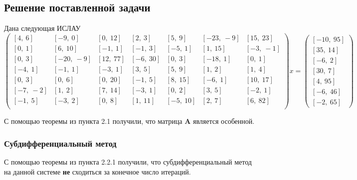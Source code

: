 \documentclass{article}
\begin{document}
    
    \subsection{Решение поставленной задачи}
    Дана следующая ИСЛАУ 
    \begin{equation*}
        \begin{pmatrix}
             [4, \ 6] & [-9, \ 0] & [0, \ 12] & [2, \ 3] & [5, \ 9] & [-23, \ -9] & [15, \ 23]\\
             [0, \ 1] & [6, \ 10] & [-1, \ 1] & [-1, \ 3] & [-5, \ 1] & [1, \ 15] & [-3, \ -1]\\
             [0, \ 3] & [-20, \ -9] & [12, \ 77] & [-6, \ 30] & [0, \ 3] & [-18, \ 1] & [0, \ 1]\\
             [-4, \ 1] & [-1, \ 1] & [-3, \ 1] & [3, \ 5] & [5, \ 9] & [1, \ 2] & [1, \ 4]\\
             [0, \ 3] & [0, \ 6] & [0, \ 20] & [-1, \ 5] & [8, \ 15] & [-6, \ 1] & [10, \ 17]\\
             [-7, \ -2] & [1, \ 2] & [7, \ 14] & [-3, \ 1] & [0, \ 2] & [3, \ 5] & [-2, \ 1]\\
             [-1, \ 5] & [-3, \ 2] & [0, \ 8] & [1, \ 11] & [-5, \ 10] & [2, \ 7] & [6, \ 82]\\
        \end{pmatrix}
        x
        =
        \begin{pmatrix}
             [-10, \ 95] \\
             [35, \ 14] \\
             [-6, \ 2] \\
             [30, \ 7] \\
             [4, \ 95] \\
             [-6, \ 46] \\
             [-2, \ 65] 
        \end{pmatrix}
        
    \end{equation*}
    
    С помощью теоремы из пункта 2.1 получили, что матрица \textbf{A} является особенной.
    
    
    \subsubsection{Субдифференциальный метод}
    С помощью теоремы из пункта 2.2.1 получили, что субдифференциальный метод на данной системе \textbf{не} сходиться за конечное число итераций.\\
    
\end{document}
